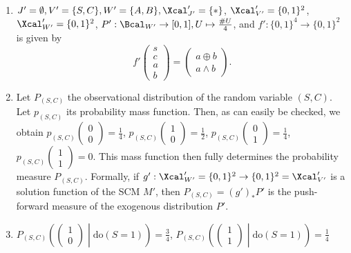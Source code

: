 \begin{enumerate}[label=9.\arabic*]
\begin{gradedsolution}
\begin{enumerate}
\begin{equation}
                \label{eq:adapted_concrete_solutions}
            \end{equation}
            which, as you can see, only changes the very last result.
            \item {} $J' = \emptyset, V' = \{S, C\}, W' = \{A, B\}, \Xcal_{J'}' = \{*\}$, $\Xcal_{V'}' = \{0,1\}^{2}$, $\Xcal_{W'}' = \{0,1\}^{2}$, $P': \Bcal_{W'} \to [0,1], U \mapsto \frac{\# U}{4}$, and $f': \{0,1\}^{4} \to \{0,1\}^{2}$ is given by
            \begin{equation}
                f' \begin{pmatrix} s \\ c \\ a \\ b \end{pmatrix} = \begin{pmatrix} a \oplus b \\ a \land b \end{pmatrix}.
                \label{eq:probabilistic_case}
            \end{equation}
            \item {} Let $P_{(S,C)}$ the observational distribution of the random variable $(S,C)$. Let $p_{(S,C)}$ its probability mass function.
            Then, as can easily be checked, we obtain $p_{(S,C)}\begin{pmatrix} 0 \\ 0 \end{pmatrix} = \frac{1}{4}$, $p_{(S,C)}\begin{pmatrix} 1 \\ 0 \end{pmatrix} = \frac{1}{2}$, $p_{(S,C)}\begin{pmatrix} 0 \\ 1 \end{pmatrix} = \frac{1}{4}$, $p_{(S,C)}\begin{pmatrix} 1 \\ 1 \end{pmatrix} = 0$.
            This mass function then fully determines the probability measure $P_{(S,C)}$.
            Formally, if $g': \Xcal'_{W'} = \{0,1\}^{2} \to \{0,1\}^{2} = \Xcal'_{V'}$ is a solution function of the SCM $M'$, then $P_{(S,C)} = (g')_*P'$ is the push-forward measure of the exogenous distribution $P'$.
            \item {} $P_{(S,C)}\left( \begin{pmatrix} 1 \\ 0 \end{pmatrix} \middle| \text{do}(S=1)\right) = \frac{3}{4}$, $P_{(S,C)}\left( \begin{pmatrix} 1 \\ 1 \end{pmatrix} \middle| \text{do}(S=1)\right) = \frac{1}{4}$

\end{enumerate}
\end{gradedsolution}
\end{enumerate}
